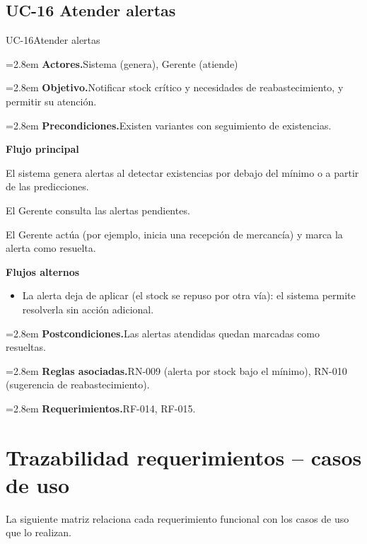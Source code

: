 \documentclass[11pt]{article}
\newcommand{\fila}[2]{\par\smallskip\noindent\hangindent=2.8em\hangafter=0
  \textbf{\sffamily\color{brand!80!black}#1.}\hspace{0.4em}#2\par}
\newcommand{\bloque}[1]{\par\smallskip\noindent\textbf{\sffamily\color{brand!80!black}#1}\par\nopagebreak}
\newenvironment{alternos}{\begin{itemize}[leftmargin=2.9em, itemsep=0.2ex, topsep=0.3ex]}{\end{itemize}}
\begin{document}
\subsection{UC-16 Atender alertas}
\begin{ficha}{UC-16}{Atender alertas}
\fila{Actores}{Sistema (genera), Gerente (atiende)}
\fila{Objetivo}{Notificar stock crítico y necesidades de reabastecimiento, y permitir su atención.}
\fila{Precondiciones}{Existen variantes con seguimiento de existencias.}
\bloque{Flujo principal}
\begin{pasos}
  \item El sistema genera alertas al detectar existencias por debajo del mínimo o a partir de las predicciones.
  \item El Gerente consulta las alertas pendientes.
  \item El Gerente actúa (por ejemplo, inicia una recepción de mercancía) y marca la alerta como resuelta.
\end{pasos}
\bloque{Flujos alternos}
\begin{alternos}
  \item[\textbf{3a.}] La alerta deja de aplicar (el stock se repuso por otra vía): el sistema permite resolverla sin acción adicional.
\end{alternos}
\fila{Postcondiciones}{Las alertas atendidas quedan marcadas como resueltas.}
\fila{Reglas asociadas}{RN-009 (alerta por stock bajo el mínimo), RN-010 (sugerencia de reabastecimiento).}
\fila{Requerimientos}{RF-014, RF-015.}
\end{ficha}



\section{Trazabilidad requerimientos -- casos de uso}
La siguiente matriz relaciona cada requerimiento funcional con los casos de uso
que lo realizan.
\end{document}

